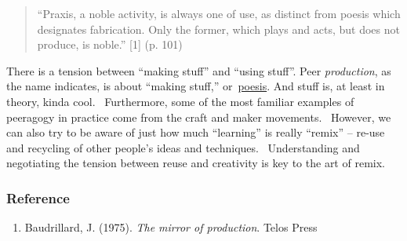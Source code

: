 \begin{quote}
``Praxis, a noble activity, is always one of use, as distinct from
poesis which designates fabrication. Only the former, which plays and
acts, but does not produce, is noble.'' {[}1{]} (p. 101)
\end{quote}

There is a tension between ``making stuff'' and ``using stuff''. Peer
\emph{production}, as the name indicates, is about ``making stuff,''
or~\href{http://en.wikipedia.org/wiki/Poiesis}{poesis}. And stuff is, at
least in theory, kinda cool.~ Furthermore, some of the most familiar
examples of peeragogy in practice come from the craft and maker
movements.~ However, we can also try to be aware of just how much
``learning'' is really ``remix'' -- re-use and recycling of other
people's ideas and techniques.~ Understanding and negotiating the
tension between reuse and creativity is key to the art of remix.

\subsubsection{Reference}

\begin{enumerate}
\item
  Baudrillard, J. (1975). \emph{The mirror of production}. Telos Press
\end{enumerate}
